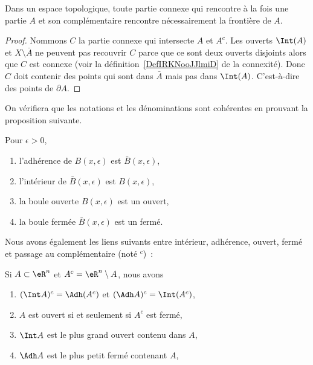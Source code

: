 \begin{lemma}        \label{LEMooLKWEooItGnkP}
	Dans un espace topologique, toute partie connexe qui rencontre à la fois une partie \( A\) et son complémentaire rencontre nécessairement la frontière de \( A\).
\end{lemma}

\begin{proof}
	Nommons \( C\) la partie connexe qui intersecte \( A\) et \( A^c\). Les ouverts \( \Int(A)\) et \( X\setminus \bar A\) ne peuvent pas recouvrir \( C\) parce que ce sont deux ouverts disjoints alors que \( C\) est connexe (voir la définition~\ref{DefIRKNooJJlmiD} de la connexité). Donc \( C\) doit contenir des points qui sont dans \( \bar A\) mais pas dans \( \Int(A)\). C'est-à-dire des points de \( \partial A\).
\end{proof}

On vérifiera que les notations et les dénominations sont cohérentes en prouvant la proposition suivante.
\begin{proposition}Pour \( \epsilon > 0\),
	\begin{enumerate}
		\item l'adhérence de \( B(x,\epsilon)\) est \( \bar B(x,\epsilon)\),
		\item l'intérieur de \( \bar B(x,\epsilon)\) est \( B(x,\epsilon)\),
		\item la boule ouverte \( B(x,\epsilon)\) est un ouvert,
		\item la boule fermée \( \bar B(x,\epsilon)\) est un fermé.
	\end{enumerate}
\end{proposition}

Nous avons également les liens suivants entre intérieur, adhérence, ouvert, fermé et passage au complémentaire (noté \( {}^c\))~:
\begin{proposition}
	Si \( A \subset \eR^n\) et \( A^c = \eR^n\setminus A\), nous
	avons
	\begin{enumerate}
		\item \( (\Int A)^c = \Adh (A^c)\) et \( (\Adh A)^c = \Int
		      (A^c)\),
		\item \( A\) est ouvert si et seulement si \( A^c\) est fermé,
		\item \( \Int A\) est le plus grand ouvert contenu dans \( A\),
		\item \( \Adh A\) est le plus petit fermé contenant \( A\),
	\end{enumerate}
\end{proposition}

